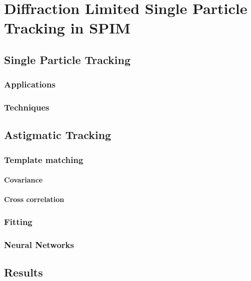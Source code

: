 \ifpdf
    \graphicspath{{Chapter/spt/Figs/Raster/}{Chapter/spt/Figs/PDF/}{Chapter/spt/Figs/}}
\else
    \graphicspath{{Chapter/spt/Figs/Vector/}{Chapter/spt/Figs/}}
\fi

\chapter{Diffraction Limited Single Particle Tracking in SPIM}
\section{Single Particle Tracking}
\subsection{Applications}
\subsection{Techniques}
\section{Astigmatic Tracking}
\subsection{Template matching}
\subsubsection{Covariance}
\subsubsection{Cross correlation}
\subsection{Fitting} %
\subsection{Neural Networks} %
\section{Results}
